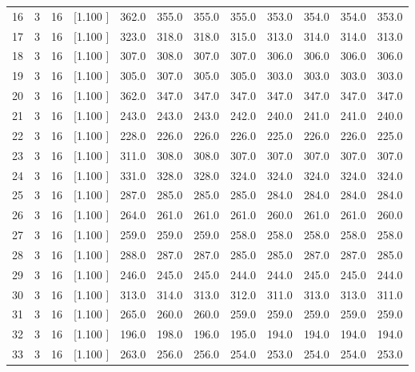 \documentclass[12pt,a4paper]{article}
\begin{document}
\begin{center}
{\begin{tabular}{r r r r r r r r r r r r}
  16&  3& 16&[1.100     ]&   362.0&   355.0&   355.0&   355.0&   353.0&   354.0&   354.0&   353.0\\[-0.02in]
  17&  3& 16&[1.100     ]&   323.0&   318.0&   318.0&   315.0&   313.0&   314.0&   314.0&   313.0\\[-0.02in]
  18&  3& 16&[1.100     ]&   307.0&   308.0&   307.0&   307.0&   306.0&   306.0&   306.0&   306.0\\[-0.02in]
  19&  3& 16&[1.100     ]&   305.0&   307.0&   305.0&   305.0&   303.0&   303.0&   303.0&   303.0\\[-0.02in]
  20&  3& 16&[1.100     ]&   362.0&   347.0&   347.0&   347.0&   347.0&   347.0&   347.0&   347.0\\[-0.02in]
  21&  3& 16&[1.100     ]&   243.0&   243.0&   243.0&   242.0&   240.0&   241.0&   241.0&   240.0\\[-0.02in]
  22&  3& 16&[1.100     ]&   228.0&   226.0&   226.0&   226.0&   225.0&   226.0&   226.0&   225.0\\[-0.02in]
  23&  3& 16&[1.100     ]&   311.0&   308.0&   308.0&   307.0&   307.0&   307.0&   307.0&   307.0\\[-0.02in]
  24&  3& 16&[1.100     ]&   331.0&   328.0&   328.0&   324.0&   324.0&   324.0&   324.0&   324.0\\[-0.02in]
  25&  3& 16&[1.100     ]&   287.0&   285.0&   285.0&   285.0&   284.0&   284.0&   284.0&   284.0\\[-0.02in]
  26&  3& 16&[1.100     ]&   264.0&   261.0&   261.0&   261.0&   260.0&   261.0&   261.0&   260.0\\[-0.02in]
  27&  3& 16&[1.100     ]&   259.0&   259.0&   259.0&   258.0&   258.0&   258.0&   258.0&   258.0\\[-0.02in]
  28&  3& 16&[1.100     ]&   288.0&   287.0&   287.0&   285.0&   285.0&   287.0&   287.0&   285.0\\[-0.02in]
  29&  3& 16&[1.100     ]&   246.0&   245.0&   245.0&   244.0&   244.0&   245.0&   245.0&   244.0\\[-0.02in]
  30&  3& 16&[1.100     ]&   313.0&   314.0&   313.0&   312.0&   311.0&   313.0&   313.0&   311.0\\[-0.02in]
  31&  3& 16&[1.100     ]&   265.0&   260.0&   260.0&   259.0&   259.0&   259.0&   259.0&   259.0\\[-0.02in]
  32&  3& 16&[1.100     ]&   196.0&   198.0&   196.0&   195.0&   194.0&   194.0&   194.0&   194.0\\[-0.02in]
  33&  3& 16&[1.100     ]&   263.0&   256.0&   256.0&   254.0&   253.0&   254.0&   254.0&   253.0\\[-0.02in]

\end{tabular}}
\end{center}
\end{document}
